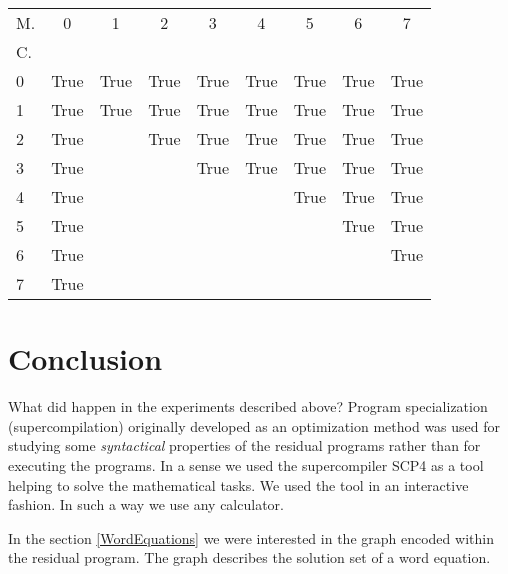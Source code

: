 \documentclass[preprint]{sigplanconf}
\newcommand{\zb}{\hspace{-0.5pt}}
\newcommand{\zbb}{\hspace{-1.0pt}}
\newcommand{\True}{\small{True}}
\begin{document}
\begin{center}
  \begin{tabular}{l|c|c|c|c|c|c|c|c}
    \hfill \zbb\zbb\zb\small{M.\tiny{}}  & 0  & 1  & 2  & 3 & 4 & 5 & 6 & 7  \\
    \zbb\zbb\zb\small{C.\tiny{}}          &    &    &    &   &   &   &   &    \\
    \hline
    0                     & \True & \True & \True & \True & \True & \True & \True & \True \\
    \hline
    1                     & \True & \True & \True & \True & \True & \True & \True & \True \\
    \hline
    2                     & \True &       & \True & \True & \True & \True & \True & \True \\
    \hline
    3                     & \True &       &      & \True & \True & \True & \True & \True \\
    \hline
    4                     & \True &       &      &       &       & \True & \True & \True \\
    \hline
    5                     & \True &       &      &       &       &       & \True & \True \\
    \hline
    6                     & \True &       &      &       &       &       &       & \True \\
    \hline
    7                     & \True &       &      &       &       &       &       &  \\
  \end{tabular}
\end{center}


\section{Conclusion}

What did happen in the experiments described above? Program specialization (supercompilation) originally developed as an optimization method was used for studying some \emph{syntactical} properties of the residual programs rather than for executing the programs. In a sense we used the supercompiler SCP4 as a tool helping to solve the mathematical tasks. We used the tool in an interactive fashion. In such a way we use any calculator. 


In the section \ref{WordEquations} we were interested in the graph encoded 
within the residual program. The graph describes the solution set of a word equation. 
\end{document}
